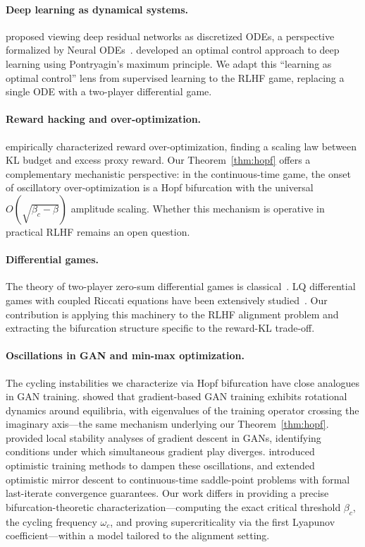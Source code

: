 \documentclass[10pt]{article}
\begin{document}
\paragraph{Deep learning as dynamical systems.}
\citet{e2017proposal} proposed viewing deep residual networks as discretized ODEs, a perspective formalized by Neural ODEs~\citep{chen2018neural}. \citet{li2018optimal} developed an optimal control approach to deep learning using Pontryagin's maximum principle.
We adapt this ``learning as optimal control'' lens from supervised learning to the RLHF game, replacing a single ODE with a two-player differential game.

\paragraph{Reward hacking and over-optimization.}
\citet{gao2023scaling} empirically characterized reward over-optimization, finding a scaling law between KL budget and excess proxy reward.
Our Theorem~\ref{thm:hopf} offers a complementary mechanistic perspective: in the continuous-time game, the onset of oscillatory over-optimization is a Hopf bifurcation with the universal $O(\sqrt{\beta_c - \beta})$ amplitude scaling.
Whether this mechanism is operative in practical RLHF remains an open question.

\paragraph{Differential games.}
The theory of two-player zero-sum differential games is classical~\citep{basar1999dynamic,isaacs1965differential}.
LQ differential games with coupled Riccati equations have been extensively studied~\citep{engwerda2005lq}.
Our contribution is applying this machinery to the RLHF alignment problem and extracting the bifurcation structure specific to the reward-KL trade-off.

\paragraph{Oscillations in GAN and min-max optimization.}
The cycling instabilities we characterize via Hopf bifurcation have close analogues in GAN training.
\citet{mescheder2017numerics} showed that gradient-based GAN training exhibits rotational dynamics around equilibria, with eigenvalues of the training operator crossing the imaginary axis---the same mechanism underlying our Theorem~\ref{thm:hopf}.
\citet{nagarajan2017gradient} provided local stability analyses of gradient descent in GANs, identifying conditions under which simultaneous gradient play diverges.
\citet{daskalakis2018training} introduced optimistic training methods to dampen these oscillations, and \citet{mertikopoulos2019optimistic} extended optimistic mirror descent to continuous-time saddle-point problems with formal last-iterate convergence guarantees.
Our work differs in providing a precise bifurcation-theoretic characterization---computing the exact critical threshold $\beta_c$, the cycling frequency $\omega_c$, and proving supercriticality via the first Lyapunov coefficient---within a model tailored to the alignment setting.
\end{document}
